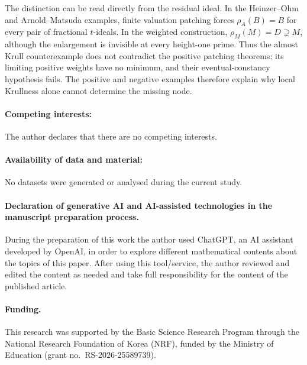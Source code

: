 \documentclass[11pt]{amsart}
\theoremstyle{definition}
\theoremstyle{remark}
\begin{document}
The distinction can be read directly from the residual ideal.  In the
Heinzer--Ohm and Arnold--Matsuda examples, finite valuation patching forces
$\rho_A(B)=B$ for every pair of fractional $t$-ideals.  In the weighted
construction, $\rho_M(M)=D\supsetneq M$, although the enlargement is
invisible at every height-one prime.  Thus the almost Krull counterexample
does not contradict the positive patching theorems: its limiting positive
weights have no minimum, and their eventual-constancy hypothesis fails.
The positive and negative examples therefore explain why local Krullness
alone cannot determine the missing node.

\medskip

\paragraph{\bf Competing interests:} The author declares that there are no competing interests.

\medskip

\paragraph{\bf Availability of data and material:}
No datasets were generated or analysed during the current study.

\medskip

\paragraph{\bf Declaration of generative AI and AI-assisted technologies in the manuscript
preparation process.} During the preparation of this work the author
used ChatGPT, an AI assistant developed by OpenAI, in order to explore different
mathematical contents about the topics of this paper. After using this tool/service,
the author reviewed and edited the content as needed and take full responsibility
for the content of the published article.

\medskip

\paragraph{\bf Funding.}
This research was supported by the Basic Science Research Program
through the National Research Foundation of Korea (NRF), funded by
the Ministry of Education (grant no.~RS-2026-25589739).
\end{document}
